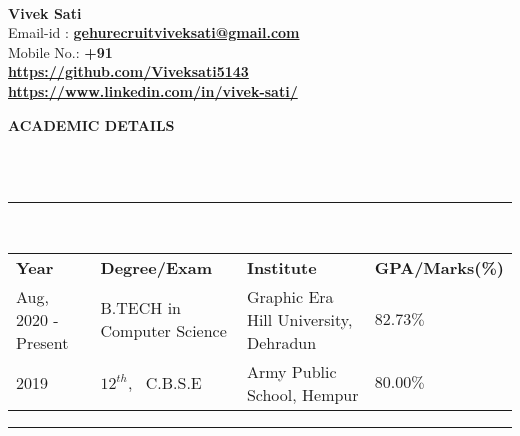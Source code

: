 \documentclass[a4paper,10pt]{article}
\newcommand{\lsep}{-0.5cm}
\newcommand{\resheading}[1]{{\small \colorbox{mygrey}{\begin{minipage}{0.975\textwidth}{\textbf{#1 \vphantom{p\^{E}}}}\end{minipage}}}}
\begin{document}
\hspace{0.5cm}\\[-0.2cm]

\textbf{Vivek Sati} \\
\indent Email-id : \textbf{\url{gehurecruitviveksati@gmail.com}} \\
\indent Mobile No.: \textbf{+91  } \ \\
\indent \textbf{\url{https://github.com/Viveksati5143}}\\
\indent \textbf{\url{https://www.linkedin.com/in/vivek-sati/}}\\

\resheading{\textbf{ACADEMIC DETAILS} }\\[\lsep]
\\
\indent \rule{6.8in}{0.4pt}\\
\indent \begin{tabular}{ l @{\hskip 0.15in} l @{\hskip 0.15in} l @{\hskip 0.15in} l @{\hskip 0.15in} }
\noindent \textbf{Year} & \textbf{Degree/Exam} & \textbf{Institute} & \textbf{GPA/Marks(\%)} \\
Aug, 2020 - Present & B.TECH in Computer Science & Graphic Era Hill University, Dehradun & $82.73 \%$ \\
2019 & $12^{th}$, \ C.B.S.E & Army Public School, Hempur & $80.00 \%$ \\

\end{tabular}
\indent \rule{6.8in}{0.4pt}
\\
\end{document}
